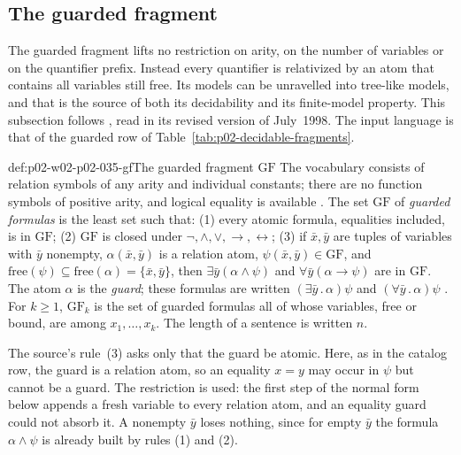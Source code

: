 \subsection{The guarded fragment}
\label{sec:p02-w02-p02-035-gf}

The guarded fragment lifts no restriction on arity, on the number of
variables or on the quantifier prefix.  Instead every quantifier is
relativized by an atom that contains all variables still free.  Its models
can be unravelled into tree-like models, and that is the source of both its
decidability and its finite-model property.  This subsection follows
\cite{Gradel1999}, read in its revised version of July~1998.  The
input language is that of the guarded row of
Table~\ref{tab:p02-decidable-fragments}.

\begin{hbdefinition}{def:p02-w02-p02-035-gf}{The guarded fragment \(\mathrm{GF}\)}
The vocabulary consists of relation symbols of any arity and individual
constants; there are no function symbols of positive arity, and logical
equality is available \cite[sect.~2]{Gradel1999}.  The set \(\mathrm{GF}\) of
\emph{guarded formulas} is the least set such that:
(1) every atomic formula, equalities included, is in \(\mathrm{GF}\);
(2) \(\mathrm{GF}\) is closed under \(\neg,\land,\lor,\to,\leftrightarrow\);
(3) if \(\bar x,\bar y\) are tuples of variables with \(\bar y\) nonempty,
\(\alpha(\bar x,\bar y)\) is a relation atom, \(\psi(\bar x,\bar y)\in\mathrm{GF}\),
and \(\mathrm{free}(\psi)\subseteq\mathrm{free}(\alpha)=\{\bar x,\bar y\}\),
then \(\exists\bar y(\alpha\land\psi)\) and \(\forall\bar y(\alpha\to\psi)\) are
in \(\mathrm{GF}\).  The atom \(\alpha\) is the \emph{guard}; these formulas
are written \((\exists\bar y\,.\,\alpha)\psi\) and \((\forall\bar y\,.\,\alpha)\psi\)
\cite[def.~2.1 and sect.~2]{Gradel1999}.  For \(k\geq1\),
\(\mathrm{GF}_k\) is the set of guarded formulas all of whose variables, free
or bound, are among \(x_1,\ldots,x_k\).  The length of a sentence is written
\(n\).
\end{hbdefinition}

The source's rule~(3) asks only that the guard be atomic.  Here, as in the
catalog row, the guard is a relation atom, so an equality \(x=y\) may occur
in \(\psi\) but cannot be a guard.  The restriction is used: the first step
of the normal form below appends a fresh variable to every relation atom,
and an equality guard could not absorb it.  A nonempty \(\bar y\) loses
nothing, since for empty \(\bar y\) the formula \(\alpha\land\psi\) is already
built by rules (1) and (2).

